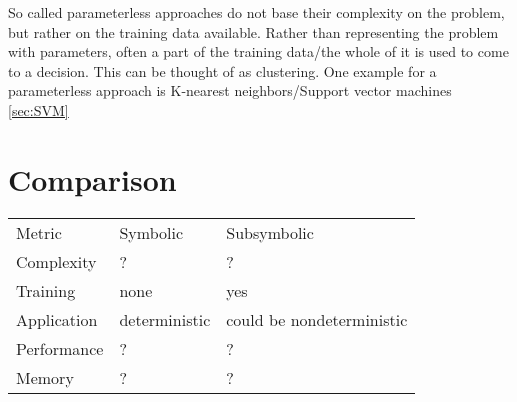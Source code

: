 So called parameterless approaches do not base their complexity on the problem, but rather on the training data available. Rather than representing the problem with parameters, often a part of the training data/the whole of it is used to come to a decision. This can be thought of as clustering.
One example for a parameterless approach is K-nearest neighbors/Support vector machines \autoref{sec:SVM}

\section{Comparison}
\begin{tabular}{l p{} p{}}
    Metric      & Symbolic  & Subsymbolic\\
    Complexity  & ? & ? \\
    Training    & none & yes \\
    Application & deterministic&could be nondeterministic\\
    Performance & ? & ? \\
    Memory      & ? & ? \\
\end{tabular}






